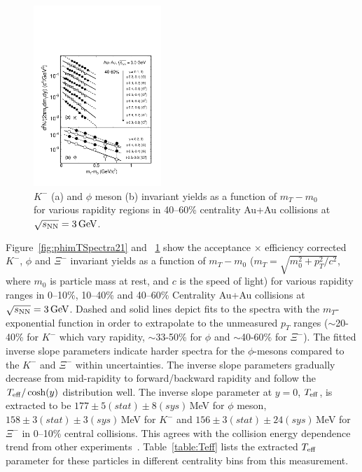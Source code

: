 \documentclass[aps,tightenlines,superscriptaddress,twocolumn]{revtex4-1}
\begin{document}
\begin{figure}
\centering
\hspace*{-10mm}
\includegraphics[width=0.43\textwidth]{fig23-eps-converted-to.pdf}
\caption{$K^-$ (a) and $\phi$ meson (b) invariant yields as a function of $m_T-m_0$ for various rapidity regions in 40--60\% centrality Au+Au collisions at ${\sqrt{s_{\rm NN}} = \rm{3\,GeV}}$.}
\label{fig:phimTSpectra23}
\end{figure}


Figure~\ref{fig:phimTSpectra21} and ~\ref{fig:phimTSpectra23} show the acceptance $\times$ efficiency corrected $K^-$, $\phi$ and $\Xi^-$ invariant yields as a function of $m_T-m_0$ ($m_T = \sqrt{m_{0}^{2}+p_{T}^2/c^{2}}$, where $m_0$ is particle mass at rest, and $c$ is the speed of light) for various rapidity ranges in 0--10\%, 10--40\% and 40--60\% Centrality Au+Au collisions at ${\sqrt{s_{\rm NN}} = \rm{3\,GeV}}$. 
Dashed and solid lines depict fits to the spectra with the $m_T$-exponential function in order to extrapolate to the unmeasured $p_T$ ranges ($\sim$20-40\% for $K^-$ which vary rapidity, $\sim$33-50\% for $\phi$ and $\sim$40-60\% for $\Xi^-$). 
The fitted inverse slope parameters indicate harder spectra for the $\phi$-mesons compared to the $K^-$ and $\Xi^-$ within uncertainties. The inverse slope parameters gradually decrease from mid-rapidity to forward/backward rapidity and follow the $T_{\rm eff}/\cosh(y)$ distribution well. The inverse slope parameter at $y=0$, $T_{\rm eff}$, is extracted to be $177\pm5 (stat)\pm8 (sys)$\,MeV for $\phi$ meson, $158\pm3 (stat)\pm3 (sys)$\,MeV for $K^{-}$ and $156\pm3 (stat)\pm24 (sys)$\,MeV for $\Xi^{-}$ in 0--10\% central collisions. This agrees with the collision energy dependence trend from other experiments~\cite{NA49_phi:2008,HADES_phi_AuAu:2018}. Table~\ref{table:Teff} lists the extracted $T_{\rm eff}$ parameter for these particles in different centrality bins from this measurement.
\end{document}
